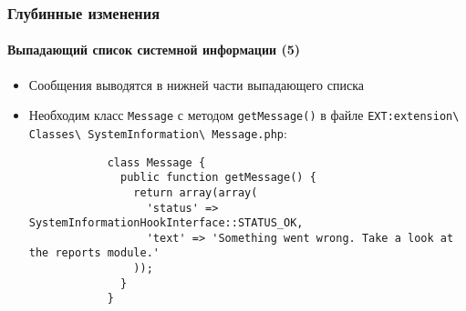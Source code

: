 \begin{frame}[fragile]
	\frametitle{Глубинные изменения}
	\framesubtitle{Выпадающий список системной информации (5)}

	\lstset{basicstyle=\tiny\ttfamily}

	\begin{itemize}

		\item Сообщения выводятся в нижней части выпадающего списка

		\item Необходим класс \texttt{Message} с методом \texttt{getMessage()} в файле
			\small
				\texttt{EXT:extension\textbackslash
					Classes\textbackslash
					SystemInformation\textbackslash
					Message.php}:
			\normalsize

		\begin{lstlisting}
			class Message {
			  public function getMessage() {
			    return array(array(
			      'status' => SystemInformationHookInterface::STATUS_OK,
			      'text' => 'Something went wrong. Take a look at the reports module.'
			    ));
			  }
			}
		\end{lstlisting}

	\end{itemize}

\end{frame}


